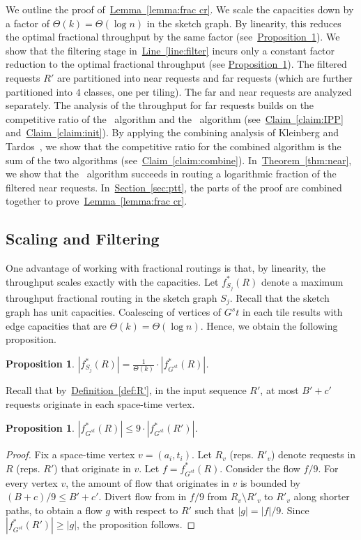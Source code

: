 \documentclass[11pt]{article}
\newtheorem{proposition}[theorem]{Proposition}
\newcommand{\namedref}[2]{\hyperref[#2]{#1~\ref*{#2}}}
\newcommand{\sectionref}[1]{\namedref{Section}{#1}}
\newcommand{\theoremref}[1]{\namedref{Theorem}{#1}}
\newcommand{\defref}[1]{\namedref{Definition}{#1}}
\newcommand{\claimref}[1]{\namedref{Claim}{#1}}
\newcommand{\lemmaref}[1]{\namedref{Lemma}{#1}}
\newcommand{\propref}[1]{\namedref{Proposition}{#1}}
\newcommand{\lineref}[1]{\namedref{Line}{#1}}
\newcommand{\route}{\text{\sc{ipp}}\xspace}
\newcommand{\IPP}{\route}
\newcommand{\routenear}{\text{\sc{route-near}}\xspace}
\newcommand{\initroute}{\text{\sc{initial-route}}\xspace}
\newenvironment{proof sketch}[1]{\noindent {\emph{Proof sketch of #1:}}}{\hfill \qed}
\newcommand{\Gst}{G^{st}}
\begin{document}
We outline the proof of~\lemmaref{lemma:frac cr}.  We scale the capacities down by a
factor of $\Theta(k)=\Theta(\log n)$ in the sketch graph.  By linearity, this reduces
the optimal fractional throughput by the same factor (see~\propref{prop:scale}).  We
show that the filtering stage in~\lineref{line:filter} incurs only a constant factor
reduction to the optimal fractional throughput (see \propref{prop:R'}).  The filtered
requests $R'$ are partitioned into near requests and far requests (which are further
partitioned into $4$ classes, one per tiling). The far and near requests are analyzed
separately.  The analysis of the throughput for far requests builds on the competitive
ratio of the \IPP\ algorithm and the \initroute\ algorithm (see~\claimref{claim:IPP}
and~\claimref{claim:init}). By applying the combining analysis of Kleinberg and
Tardos~\cite{KT}, we show that the competitive ratio for the combined algorithm is
the sum of the two algorithms (see~\claimref{claim:combine}).
In~\theoremref{thm:near}, we show that the \routenear\ algorithm succeeds in routing
a logarithmic fraction of the filtered near requests.  In~\sectionref{sec:ptt}, the
parts of the proof are combined together to prove~\lemmaref{lemma:frac cr}.

\subsection{Scaling and Filtering}
One advantage of working with fractional routings is that, by linearity, the
throughput scales exactly with the capacities.  Let $f^*_{S_j}(R)$ denote a maximum
throughput fractional routing in the sketch graph $S_j$.  Recall that the sketch
graph has unit capacities. Coalescing of vertices of $G^st$ in each tile results with
edge capacities that are $\Theta(k)=\Theta(\log n)$. Hence, we obtain the following
proposition.
\begin{proposition}\label{prop:scale}
  $|f^*_{S_j}(R)| = \frac{1}{\Theta(k)} \cdot |f^*_{\Gst}(R)|$.
\end{proposition}

\noindent
Recall that by~\defref{def:R'}, in the input sequence $R'$, at most $B'+c'$ requests
originate in each space-time vertex.
\begin{proposition}\label{prop:R'}
$   |f^*_{\Gst}(R)| \leq 9 \cdot  |f^*_{\Gst}(R')|$.
\end{proposition}
\begin{proof}
  Fix a space-time vertex $v=(a_i,t_i)$.  Let $R_v$ (reps. $R'_v$) denote requests in
  $R$ (reps. $R'$) that originate in $v$. Let $f=f^*_{\Gst}(R)$. Consider the flow $f/9$.  For
  every vertex $v$, the amount of flow that originates in $v$ is bounded by $(B+c)/9
  \leq B'+c'$.  Divert flow from in $f/9$ from $R_v\setminus R'_v$ to $R'_v$ along shorter
  paths, to obtain a flow $g$ with respect to $R'$ such that $|g| = |f|/9$. Since
  $|f^*_{\Gst}(R') |\geq |g|$, the proposition follows.
\end{proof}
\end{document}
